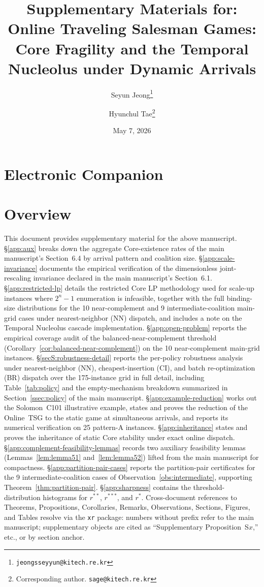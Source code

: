 \documentclass[11pt]{article}
\title{\textbf{Supplementary Materials for:\\
Online Traveling Salesman Games: Core Fragility and the Temporal Nucleolus under Dynamic Arrivals}}
\author[1]{Seyun Jeong\thanks{\texttt{jeongsseyyun@kitech.re.kr}}}
\author[1]{Hyunchul Tae\thanks{Corresponding author. \texttt{sage@kitech.re.kr}}}
\affil[1]{Korea Institute of Industrial Technology (KITECH), Cheonan, Republic of Korea}
\date{May 7, 2026}
\theoremstyle{plain}
\theoremstyle{definition}
\theoremstyle{remark}
\begin{document}
\maketitle

\section*{Electronic Companion}

\section*{Overview}
This document provides supplementary material for the above manuscript. \S\ref{app:aux} breaks down the aggregate Core-existence rates of the main manuscript's Section~6.4 by arrival pattern and coalition size. \S\ref{app:scale-invariance} documents the empirical verification of the dimensionless joint-rescaling invariance declared in the main manuscript's Section~6.1. \S\ref{app:restricted-lp} details the restricted Core LP methodology used for scale-up instances where $2^n-1$ enumeration is infeasible, together with the full binding-size distributions for the 10 near-complement and 9 intermediate-coalition main-grid cases under nearest-neighbor (NN) dispatch, and includes a note on the Temporal Nucleolus cascade implementation. \S\ref{app:open-problem} reports the empirical coverage audit of the balanced-near-complement threshold (Corollary~\ref{cor:balanced-near-complement}) on the 10 near-complement main-grid instances. \S\ref{secS:robustness-detail} reports the per-policy robustness analysis under nearest-neighbor (NN), cheapest-insertion (CI), and batch re-optimization (BR) dispatch over the 175-instance grid in full detail, including Table~\ref{tab:policy} and the empty-mechanism breakdown summarized in Section~\ref{ssec:policy} of the main manuscript. \S\ref{app:example-reduction} works out the Solomon~C101 illustrative example, states and proves the reduction of the Online~TSG to the static game at simultaneous arrivals, and reports its numerical verification on 25 pattern-A instances. \S\ref{app:inheritance} states and proves the inheritance of static Core stability under exact online dispatch. \S\ref{app:complement-feasibility-lemmas} records two auxiliary feasibility lemmas (Lemmas~\ref{lem:lemma51} and~\ref{lem:lemma52}) lifted from the main manuscript for compactness. \S\ref{app:partition-pair-cases} reports the partition-pair certificates for the 9 intermediate-coalition cases of Observation~\ref{obs:intermediate}, supporting Theorem~\ref{thm:partition-pair}. \S\ref{app:sharpness} contains the threshold-distribution histograms for $r^{\ast\ast}$, $r^{\ast\ast\ast}$, and $r^{\ast}$. Cross-document references to Theorems, Propositions, Corollaries, Remarks, Observations, Sections, Figures, and Tables resolve via the \texttt{xr} package: numbers without prefix refer to the main manuscript; supplementary objects are cited as ``Supplementary Proposition~S$x$,'' etc., or by section anchor.
\end{document}
